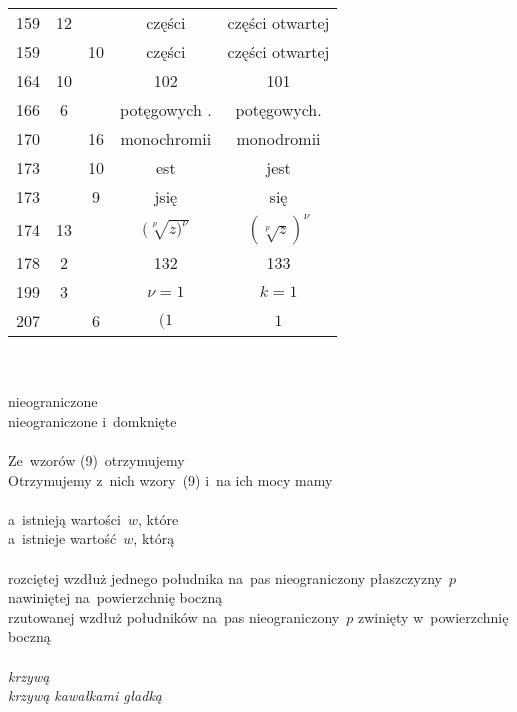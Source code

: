 \documentclass[a4paper,11pt]{article}
\begin{document}
\begin{center}
\begin{tabular}{|c|c|c|c|c|}
    159 & 12 & & części & części otwartej \\
    159 & & 10 & części & części otwartej \\
    164 & 10 & & 102 & 101 \\
    166 &  6 & & potęgowych . & potęgowych. \\
    170 & & 16 & monochromii & monodromii \\
    173 & & 10 & est & jest \\
    173 & &  9 & jsię & się \\
    174 & 13 & & $( \sqrt[p]{ z )^{ \nu } }$ & $( \sqrt[p]{ z } )^{ \nu }$ \\
    178 &  2 & & 132 & 133 \\
    199 &  3 & & $\nu = 1 $ & $k = 1$ \\
    207 & &  6 & $( 1$ & $1$ \\
    \hline
  \end{tabular}

\end{center}
\noi \\
 \\
\Jest nieograniczone \\
\Powin  nieograniczone i~domknięte \\
 \\
\Jest Ze~wzorów (9)~otrzymujemy \\
\Powin  Otrzymujemy z~nich wzory~(9) i~na ich mocy mamy \\
 \\
\Jest a~istnieją wartości~$w$, które \\
\Powin  a~istnieje wartość~$w$, którą \\
 \\
\Jest rozciętej wzdłuż jednego południka na~pas nieograniczony
płaszczyzny~$p$ nawiniętej na~powierzchnię boczną \\
\Powin rzutowanej wzdłuż południków na~pas nieograniczony~$p$ zwinięty
w~powierzchnię boczną \\
 \\
\Jest \emph{krzywą} \\
\Powin  \emph{krzywą kawałkami gładką} \\
 \\
\end{document}
